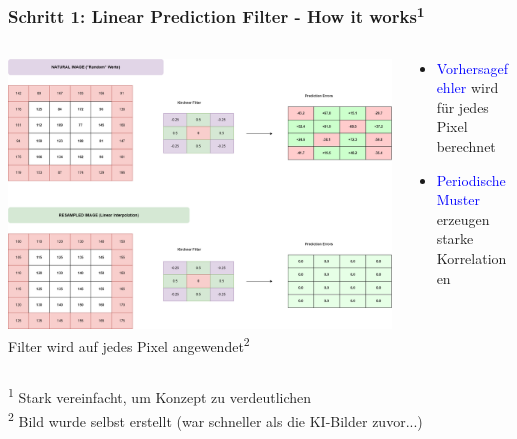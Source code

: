 \documentclass[11pt,t,usepdftitle=false,aspectratio=169]{beamer}
\begin{document}
\begin{frame}
	\frametitle{Schritt 1: Linear Prediction Filter - How it works\textsuperscript{1}}

	\begin{columns}[T]
		\begin{column}{0.60\textwidth}
			\includegraphics[width=\textwidth]{images/apply_filter.png}
			\small Filter wird auf jedes Pixel angewendet\textsuperscript{2}
		\end{column}
		\begin{column}{0.38\textwidth}
			\begin{itemize}
				\item \textcolor{blue}{Vorhersagefehler} wird für jedes Pixel berechnet
				\item \textcolor{blue}{Periodische Muster} erzeugen starke Korrelationen
			\end{itemize}
		\end{column}			
	\end{columns}

	\vspace{-4.5em}
	\hfill \begin{minipage}{0.38\textwidth}
		\begin{footnotesize}
			\textsuperscript{1} Stark vereinfacht, um Konzept zu verdeutlichen\\
			\textsuperscript{2} Bild wurde selbst erstellt (war schneller als die KI-Bilder zuvor...)
		\end{footnotesize}
	\end{minipage}
\end{frame}
\end{document}

